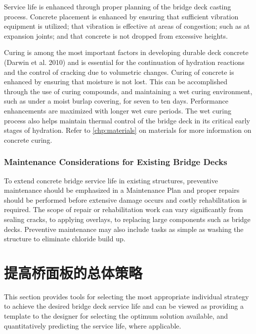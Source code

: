 Service life is enhanced through proper planning of the bridge deck casting process. Concrete placement is
enhanced by ensuring that sufficient vibration equipment is utilized; that vibration is effective at areas of congestion;
such as at expansion joints; and that concrete is not dropped from excessive heights.

Curing is among the most important factors in developing durable deck concrete (Darwin et al. 2010) and is
essential for the continuation of hydration reactions and the control of cracking due to volumetric changes. Curing of
concrete is enhanced by ensuring that moisture is not lost. This can be accomplished through the use of curing
compounds, and maintaining a wet curing environment, such as under a moist burlap covering, for seven to ten days.
Performance enhancements are maximized with longer wet cure periods. The wet curing process also helps maintain
thermal control of the bridge deck in its critical early stages of hydration. Refer to \cref{chp:materials} on materials for more
information on concrete curing.

\subsubsection{Maintenance Considerations for Existing Bridge Decks}

To extend concrete bridge service life in existing structures, preventive maintenance should be emphasized in a
Maintenance Plan and proper repairs should be performed before extensive damage occurs and costly rehabilitation is
required. The scope of repair or rehabilitation work can vary significantly from sealing cracks, to applying overlays, to replacing large components such as bridge decks. Preventive maintenance may also include tasks as simple as
washing the structure to eliminate chloride build up.



\section{提高桥面板的总体策略}
\label{sec:overall-strategy}

This section provides tools for selecting the most appropriate individual strategy to achieve the desired bridge
deck service life and can be viewed as providing a template to the designer for selecting the optimum solution
available, and quantitatively predicting the service life, where applicable.

